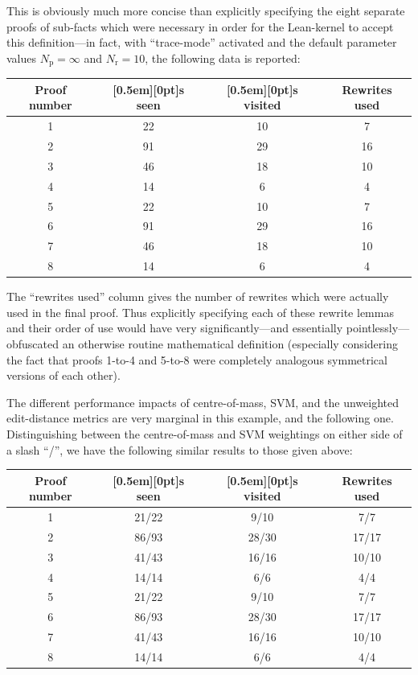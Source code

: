 \documentclass[a4paper]{article}
\theoremstyle{plain}
\theoremstyle{definition}
\newcommand{\xx}[1]{{\colorbox{gray!15}{\raisebox{0em}[0.5em][0pt]{\makebox[\width-0.4em]{\texttt{#1}}}}}}
\newcommand{\expr}{\xx{expr}}
\begin{document}
This is obviously much more concise than explicitly specifying the eight separate proofs of sub-facts which were necessary in order for the Lean-kernel to accept this definition---in fact, with ``trace-mode'' activated and the default parameter values $N_\text{p} = \infty$ and $N_\text{r} = 10$, the following data is reported:
\begin{center}
  \begin{tabular}{c c c c}
    \toprule
    Proof number & \expr{}s seen & \expr{}s visited & Rewrites used\\\midrule
1 & 22 & 10 & 7\\
2 & 91 & 29 & 16\\
3 & 46 & 18 & 10\\
4 & 14 & 6 & 4\\
5 & 22 & 10 & 7\\
6 & 91 & 29 & 16\\
7 & 46 & 18 & 10\\
8 & 14 & 6 & 4\\\bottomrule
  \end{tabular}
\end{center}
The ``rewrites used'' column gives the number of rewrites which were actually used in the final proof. Thus explicitly specifying each of these rewrite lemmas and their order of use would have very significantly---and essentially pointlessly---obfuscated an otherwise routine mathematical definition (especially considering the fact that proofs 1-to-4 and 5-to-8 were completely analogous symmetrical versions of each other).

The different performance impacts of centre-of-mass, SVM, and the unweighted edit-distance metrics are very marginal in this example, and the following one.
Distinguishing between the centre-of-mass and SVM weightings on either side of a slash ``/'', we have the following similar results to those given above:
\begin{center}
  \begin{tabular}{c c c c}
    \toprule
    Proof number & \expr{}s seen & \expr{}s visited & Rewrites used\\\midrule
    1 & 21/22 & 9/10 & 7/7\\
    2 & 86/93 & 28/30 & 17/17\\
    3 & 41/43 & 16/16 & 10/10\\
    4 & 14/14 & 6/6 & 4/4\\
    5 & 21/22 & 9/10 & 7/7\\
    6 & 86/93 & 28/30 & 17/17\\
    7 & 41/43 & 16/16 & 10/10\\
    8 & 14/14 & 6/6 & 4/4\\\bottomrule
  \end{tabular}
\end{center}
\end{document}
